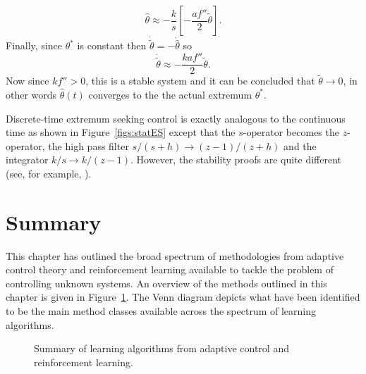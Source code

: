 \begin{equation}
\hat\theta \approx -\frac{k}{s}\left[ -\frac{af''}{2}\tilde\theta \right].
\end{equation}
Finally, since $\theta^*$ is constant then $\dot{\tilde\theta} = -\dot{\hat\theta}$ so
\begin{equation}
\dot{\tilde\theta} \approx -\frac{kaf''}{2}\tilde\theta.
\end{equation}
Now since $kf''>0$, this is a stable system and it can be concluded that $\tilde\theta \rightarrow 0$, in other words $\hat\theta(t)$ converges to the the actual extremum $\theta^*$.


Discrete-time extremum seeking control is exactly analogous to the continuous time as shown in Figure~\ref{figs:statES} except that the $s$-operator becomes the $z$-operator, the high pass filter $s/(s+h) \rightarrow (z-1)/(z+h)$ and the integrator $k/s \rightarrow k/(z-1)$. However, the stability proofs are quite different (see, for example, \cite{CKAL02}).



\section{Summary}
This chapter has outlined the broad spectrum of methodologies from adaptive control theory and reinforcement learning available to tackle the problem of controlling unknown systems. An overview of the methods outlined in this chapter is given in Figure~\ref{figs:venny}. The Venn diagram depicts what have been identified to be the main method classes available across the spectrum of learning algorithms.

\begin{figure}
\centering

\caption{Summary of learning algorithms from adaptive control and reinforcement learning. }
\label{figs:venny}
\end{figure}

